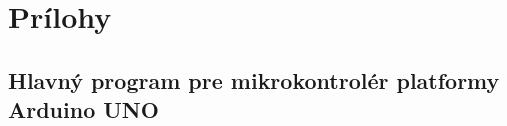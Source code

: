 

\setcounter{section}{16}
\setcounter{subsection}{0}
\setcounter{figure}{0}
\renewcommand{\thesection}{\Alph{section}}






\section*{Prílohy}
\label{sec:zdrojove_kody_arduino}



\subsection{Hlavný program pre mikrokontrolér platformy Arduino UNO}
\label{sec:main_cpp_appendix}


